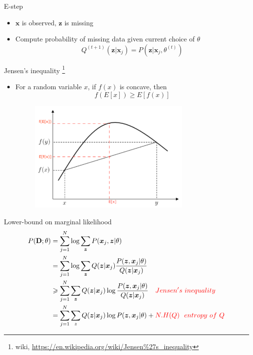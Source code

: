 \documentclass[12pt]{beamer}
\begin{document}
\begin{frame}{E-step}
\begin{itemize}
	\item $\bm{x}$ is observed, $\bm{z}$ is missing
	\item Compute probability of missing data given current choice of $\theta$
	\begin{equation} \nonumber
	Q^{(t+1)}(\bm{z}|\bm{x}_j) = P(\bm{z}|\bm{x}_j, \theta^{(t)})
	\end{equation}
\end{itemize}
\end{frame}

\begin{frame}{Jensen's inequality \footnote{\scriptsize{wiki, \url{https://en.wikipedia.org/wiki/Jensen\%27s_inequality}}}}
\begin{itemize}
	\item For a random variable $x$, if $f(x)$ is concave, then
	\begin{equation} \nonumber
	f(E[x])\geqslant E[f(x)]
	\end{equation}
	\begin{figure}
	\includegraphics[width=8cm]{pics/jensen_concave}
	\end{figure}
\end{itemize}
\end{frame}

\begin{frame}{Lower-bound on marginal likelihood}
\begin{equation}\nonumber
\begin{aligned}
P(\mathbf{D};\theta) &= \sum_{j=1}^{N}\log \sum_{\bm{z}}P(\bm{x}_j,\bm{z}|\theta) \\
&= \sum_{j=1}^{N}\log \sum_{\bm{z}}Q(\bm{z}|\bm{x}_j)\frac{P(\bm{z},\bm{x}_j|\theta)}{Q(\bm{z}|\bm{x}_j)} \\
&\geqslant \sum_{j=1}^{N} \sum_{\bm{z}}Q(\bm{z}|\bm{x}_j) \log \frac{P(\bm{z},\bm{x}_j|\theta)}{Q(\bm{z}|\bm{x}_j)} \quad \textcolor{red}{Jensen's~inequality} \\
&= \sum_{j=1}^{N}\sum_{z}Q(\bm{z}|\bm{x}_j)\log P(\bm{z},\bm{x}_j|\theta)+\textcolor{red}{N.H(Q) ~~ entropy~of~Q}
\end{aligned}
\end{equation}
\end{frame}
\end{document}
